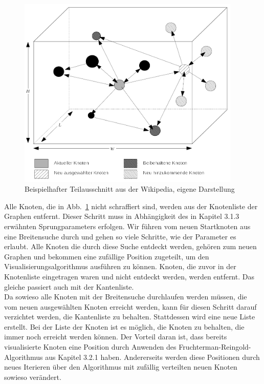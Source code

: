 \documentclass[12pt, a4paper]{article}
\begin{document}
\begin{figure}[h!]
\centering
\includegraphics[width=0.95\textwidth]{expandingNewNode.png}
\caption[Beispielhafter Teilausschnitt aus der Wikipedia]{Beispielhafter Teilausschnitt aus der Wikipedia, eigene Darstellung}
\label{expandingNewNode}
\end{figure}

Alle Knoten, die in Abb.~\ref{expandingNewNode} nicht schraffiert sind, werden aus der Knotenliste der Graphen entfernt. Dieser Schritt muss in Abhängigkeit des in Kapitel 3.1.3 erwähnten Sprungparameters erfolgen. Wir führen vom neuen Startknoten aus eine Breitensuche durch und gehen so viele Schritte, wie der Parameter es erlaubt. Alle Knoten die durch diese Suche entdeckt werden, gehören zum neuen Graphen und bekommen eine zufällige Position zugeteilt, um den Visualisierungsalgorithmus ausführen zu können. Knoten, die zuvor in der Knotenliste eingetragen waren und nicht entdeckt werden, werden entfernt. Das gleiche passiert auch mit der Kantenliste.\\

Da sowieso alle Knoten mit der Breitensuche durchlaufen werden müssen, die vom neuen ausgewählten Knoten erreicht werden, kann für diesen Schritt darauf verzichtet werden, die Kantenliste zu behalten. Stattdessen wird eine neue Liste erstellt. Bei der Liste der Knoten ist es möglich, die Knoten zu behalten, die immer noch erreicht werden können. Der Vorteil daran ist, dass bereits visualisierte Knoten eine Position durch Anwenden des Fruchterman-Reingold-Algorithmus aus Kapitel 3.2.1 haben. Andererseits werden diese Positionen durch neues Iterieren über den Algorithmus mit zufällig verteilten neuen Knoten sowieso verändert.\\
\end{document}
